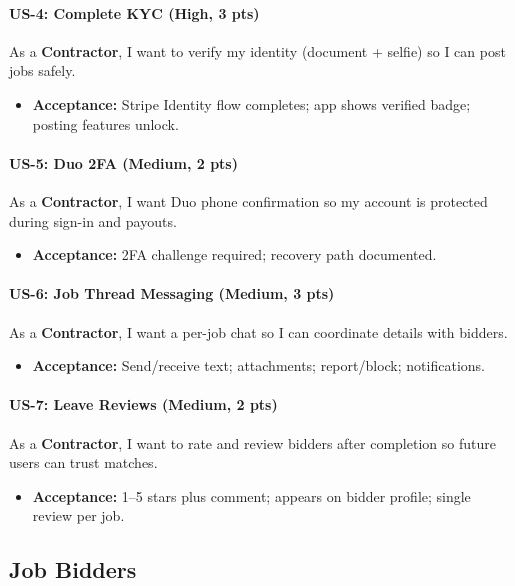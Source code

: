 \documentclass[11pt]{article}
\begin{document}
\paragraph{US-4: Complete KYC (High, 3 pts)}
As a \textbf{Contractor}, I want to verify my identity (document + selfie) so I can post jobs safely.
\begin{itemize}[leftmargin=1.4em]
  \item \textbf{Acceptance:} Stripe Identity flow completes; app shows verified badge; posting features unlock.
\end{itemize}

\paragraph{US-5: Duo 2FA (Medium, 2 pts)}
As a \textbf{Contractor}, I want Duo phone confirmation so my account is protected during sign-in and payouts.
\begin{itemize}[leftmargin=1.4em]
  \item \textbf{Acceptance:} 2FA challenge required; recovery path documented.
\end{itemize}

\paragraph{US-6: Job Thread Messaging (Medium, 3 pts)}
As a \textbf{Contractor}, I want a per-job chat so I can coordinate details with bidders.
\begin{itemize}[leftmargin=1.4em]
  \item \textbf{Acceptance:} Send/receive text; attachments; report/block; notifications.
\end{itemize}

\paragraph{US-7: Leave Reviews (Medium, 2 pts)}
As a \textbf{Contractor}, I want to rate and review bidders after completion so future users can trust matches.
\begin{itemize}[leftmargin=1.4em]
  \item \textbf{Acceptance:} 1–5 stars plus comment; appears on bidder profile; single review per job.
\end{itemize}

\subsection*{Job Bidders}
\end{document}
